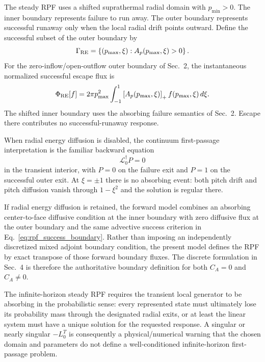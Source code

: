 \documentclass[11pt]{article}
\begin{document}
The steady RPF uses a shifted suprathermal radial domain with $p_{\min}>0$.  The inner
boundary represents failure to run away.  The outer boundary represents successful
runaway only when the local radial drift points outward.  Define the successful subset
of the outer boundary by
\begin{equation}
 \Gamma_{\rm RE}
 =\left\{(p_{\max},\xi):A_p(p_{\max},\xi)>0\right\}.
 \label{eq:rpf_success_boundary}
\end{equation}
For the zero-inflow/open-outflow outer boundary of Sec.~2, the instantaneous normalized
successful escape flux is
\begin{equation}
 \Phi_{\rm RE}[f]
 =2\pi p_{\max}^2
   \int_{-1}^{1}
   \left[A_p(p_{\max},\xi)\right]_+
   f(p_{\max},\xi)\,d\xi.
 \label{eq:continuum_success_flux}
\end{equation}
The shifted inner boundary uses the absorbing failure semantics of
Sec.~2.  Escape there contributes no successful-runaway response.

When radial energy diffusion is disabled, the continuum first-passage interpretation is
the familiar backward equation
\begin{equation}
 \mathcal L_0^\dagger P=0
 \label{eq:continuum_steady_rpf}
\end{equation}
in the transient interior, with $P=0$ on the failure exit and $P=1$ on the successful
outer exit.  At $\xi=\pm1$ there is no absorbing event: both pitch drift and pitch
diffusion vanish through $1-\xi^2$ and the solution is regular there.

If radial energy diffusion is retained, the forward model combines an absorbing
center-to-face diffusive condition at the inner boundary with zero diffusive flux at the
outer boundary and the same advective success criterion in
Eq.~\eqref{eq:rpf_success_boundary}.  Rather than imposing an independently discretized
mixed adjoint boundary condition, the present model defines the RPF by exact transpose
of those forward boundary fluxes.  The discrete formulation in Sec.~4 is therefore the
authoritative boundary definition for both $C_A=0$ and $C_A\ne0$.

The infinite-horizon steady RPF requires the transient local generator to be absorbing
in the probabilistic sense: every represented state must ultimately lose its probability
mass through the designated radial exits, or at least the linear system must have a
unique solution for the requested response.  A singular or nearly singular
$-L_0^T$ is consequently a physical/numerical warning that the chosen domain and
parameters do not define a well-conditioned infinite-horizon first-passage problem.
\end{document}
